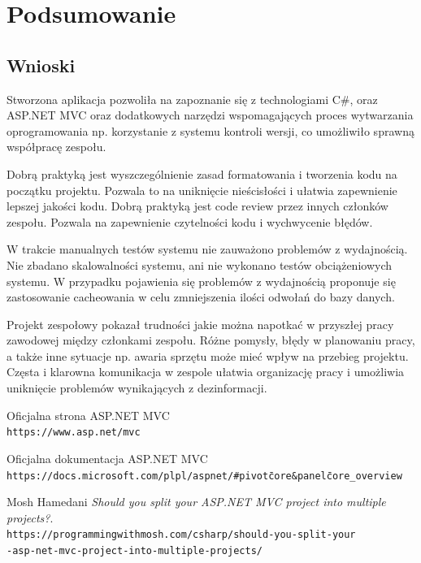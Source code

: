 \documentclass{article}
\begin{document}
\newpage

\section{Podsumowanie}

\subsection{Wnioski}
Stworzona aplikacja pozwoliła na zapoznanie się z technologiami C\#, oraz \\ ASP.NET MVC oraz dodatkowych narzędzi wspomagających proces wytwarzania oprogramowania np. korzystanie z systemu kontroli wersji, co umożliwiło sprawną współpracę zespołu.  

Dobrą praktyką jest wyszczególnienie zasad formatowania i tworzenia kodu na początku projektu. Pozwala to na uniknięcie nieścisłości i ułatwia zapewnienie lepszej jakości kodu. Dobrą praktyką jest code review przez innych członków zespołu. Pozwala na zapewnienie czytelności kodu i wychwycenie błędów. 

W trakcie manualnych testów systemu nie zauważono problemów z wydajnością. Nie zbadano skalowalności systemu, ani nie wykonano testów obciążeniowych systemu. W przypadku pojawienia się problemów z wydajnością proponuje się zastosowanie cacheowania w celu zmniejszenia ilości odwołań do bazy danych.

Projekt zespołowy pokazał trudności jakie można napotkać w przyszłej pracy zawodowej między członkami zespołu. Różne pomysły, błędy w planowaniu pracy, a także inne sytuacje np. awaria sprzętu może mieć wpływ na przebieg projektu. Częsta i klarowna komunikacja w zespole ułatwia organizację pracy i umożliwia uniknięcie problemów wynikających z dezinformacji.


\newpage
\begin{thebibliography}{9}

Oficjalna strona ASP.NET MVC
\\\texttt{https://www.asp.net/mvc}

Oficjalna dokumentacja ASP.NET MVC
\\\texttt{https://docs.microsoft.com/pl\-pl/aspnet/\#pivot\=core\&panel\=core\_overview}

Mosh Hamedani
\textit{Should you split your ASP.NET MVC project into multiple projects?}.
\\\texttt{https://programmingwithmosh.com/csharp/should-you-split-your\\-asp-net-mvc-project-into-multiple-projects/}

\end{thebibliography}
\newpage

\listoffigures
\newpage
\end{document}
